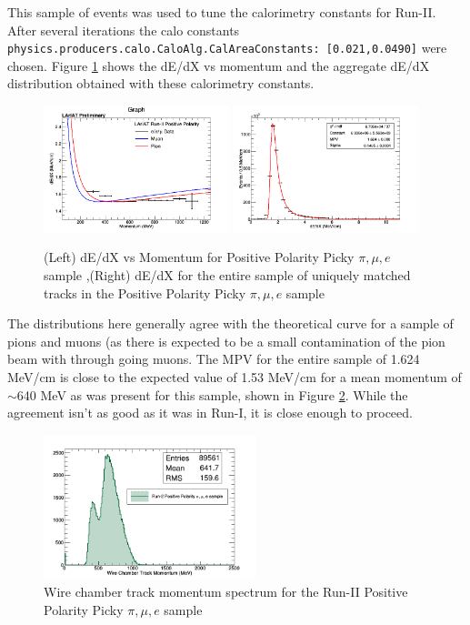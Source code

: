 This sample of events was used to tune the calorimetry constants for Run-II. After several iterations the calo constants \verb!physics.producers.calo.CaloAlg.CalAreaConstants: [0.021,0.0490]! were chosen. Figure \ref{fig:Run2PosPickyTrkPiMuEResults} shows the dE/dX vs momentum and the aggregate dE/dX distribution obtained with these calorimetry constants.

\begin{figure}[htb]
\centering
\includegraphics[width=0.48\textwidth]{images/dEdXvsMomentumPosPolRun2FineBin.png}
\includegraphics[width=0.48\textwidth]{images/dEdXPosPolRun2.png}
\caption{(Left) dE/dX vs Momentum for Positive Polarity Picky $\pi, \mu, e$ sample ,(Right) dE/dX for the entire sample of uniquely matched tracks in the Positive Polarity Picky $\pi, \mu, e$ sample }
\label{fig:Run2PosPickyTrkPiMuEResults}
\end{figure}

The distributions here generally agree with the theoretical curve for a sample of pions and muons (as there is expected to be a small contamination of the pion beam with through going muons. The MPV for the entire sample of 1.624 MeV/cm is close to the expected value of 1.53 MeV/cm for a mean momentum of $\sim$640 MeV as was present for this sample, shown in Figure \ref{fig:Run1NegPickyTrkPiMuEMomentumSpec}. While the agreement isn't as good as it was in Run-I, it is close enough to proceed.

\begin{figure}[htb]
\centering
\includegraphics[width=0.55\textwidth]{images/WCTrkMomentumRun2PosPiMuE.png}
\caption{Wire chamber track momentum spectrum for the Run-II Positive Polarity Picky $\pi, \mu, e$ sample  }
\label{fig:Run1NegPickyTrkPiMuEMomentumSpec}
\end{figure}

